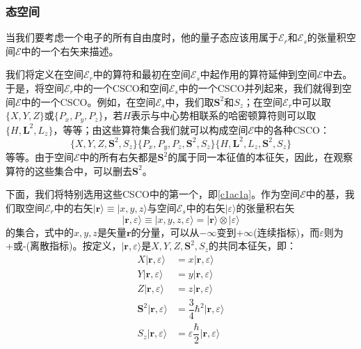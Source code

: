 \documentclass[]{article}
\begin{document}
\subsubsection{态空间}
当我们要考虑一个电子的所有自由度时，他的量子态应该用属于$\mathscr{E}_r$和$\mathscr{E}_s$的张量积空间$\mathscr{E}$中的一个右矢来描述。\par 
我们将定义在空间$\mathscr{E}_r$中的算符和最初在空间$\mathscr{E}_s$中起作用的算符延伸到空间$\mathscr{E}$中去。于是，将空间$\mathscr{E}_r$中的一个CSCO和空间$\mathscr{E}_s$中的一个CSCO并列起来，我们就得到空间$\mathscr{E}$中的一个CSCO。例如，在空间$\mathscr{E}_s$中，我们取$\boldsymbol{S}^2$和$S_z$；在空间$\mathscr{E}_r$中可以取$\{X,Y,Z\}$或$\{P_x,P_y,P_z\}$，若$H$表示与中心势相联系的哈密顿算符则可以取$\{H,\boldsymbol{L}^2,L_z\}$，等等；由这些算符集合我们就可以构成空间$\mathscr{E}$中的各种CSCO：
\begin{subequations}
	\begin{equation}
		\{X,Y,Z,\boldsymbol{S}^2,S_z\}
		\label{c1ac1a}
	\end{equation}
	\begin{equation}
		\{P_x,P_y,P_z,\boldsymbol{S}^2,S_z\}
	\end{equation}
	\begin{equation}
		\{H,\boldsymbol{L}^2,L_z,\boldsymbol{S}^2,S_z\}
	\end{equation}
\end{subequations}
等等。由于空间$\mathscr{E}$中的所有右矢都是$\boldsymbol{S}^2$的属于同一本征值的本征矢，因此，在观察算符的这些集合中，可以删去$\boldsymbol{S}^2$。\par 
下面，我们将特别选用这些CSCO中的第一个，即\eqref{c1ac1a}。作为空间$\mathscr{E}$中的基，我们取空间$\mathscr{E}_r$中的右矢$|\boldsymbol{r}\rangle\equiv|x,y,z\rangle$与空间$\mathscr{E}_s$中的右矢$|\varepsilon\rangle$的张量积右矢
\begin{equation}
	|\boldsymbol{r},\varepsilon\rangle\equiv|x,y,z,\varepsilon\rangle=|\boldsymbol{r}\rangle\otimes|\varepsilon\rangle
\end{equation}
的集合，式中的$x,y,z$是矢量$\boldsymbol{r}$的分量，可以从$-\infty$变到$+\infty$(连续指标)，而$\varepsilon$则为+或-(离散指标)。按定义，$|\boldsymbol{r},\varepsilon\rangle$是$X,Y,Z,\boldsymbol{S}^2,S_z$的共同本征矢，即：
\begin{align}
	X|\boldsymbol{r},\varepsilon\rangle&=x|\boldsymbol{r},\varepsilon\rangle\nonumber\\
	Y|\boldsymbol{r},\varepsilon\rangle&=y|\boldsymbol{r},\varepsilon\rangle\nonumber\\
	Z|\boldsymbol{r},\varepsilon\rangle&=z|\boldsymbol{r},\varepsilon\rangle\nonumber\\
	\boldsymbol{S}^2|\boldsymbol{r},\varepsilon\rangle&=\dfrac{3}{4}\hbar^2|\boldsymbol{r},\varepsilon\rangle\nonumber\\
	S_z|\boldsymbol{r},\varepsilon\rangle&=\varepsilon\dfrac{\hbar}{2}|\boldsymbol{r},\varepsilon\rangle
\end{align}
\end{document}
